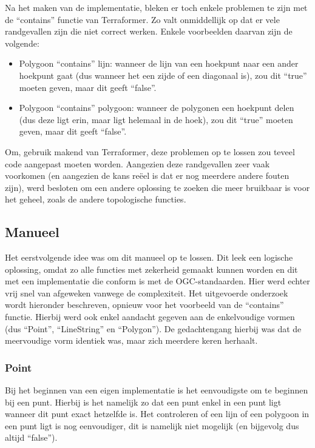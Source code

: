 Na het maken van de implementatie, bleken er toch enkele problemen te zijn met de ``contains'' functie van Terraformer. Zo valt onmiddellijk op dat er vele randgevallen zijn die niet correct werken. Enkele voorbeelden daarvan zijn de volgende:
\begin{itemize}
    \item Polygoon ``contains'' lijn: wanneer de lijn van een hoekpunt naar een ander hoekpunt gaat (dus wanneer het een zijde of een diagonaal is), zou dit ``true'' moeten geven, maar dit geeft ``false''.
    \item Polygoon ``contains'' polygoon: wanneer de polygonen een hoekpunt delen (dus deze ligt erin, maar ligt helemaal in de hoek), zou dit ``true'' moeten geven, maar dit geeft ``false''.
\end{itemize}

Om, gebruik makend van Terraformer, deze problemen op te lossen zou teveel code aangepast moeten worden. Aangezien deze randgevallen zeer vaak voorkomen (en aangezien de kans reëel is dat er nog meerdere andere fouten zijn), werd besloten om een andere oplossing te zoeken die meer bruikbaar is voor het geheel, zoals de andere topologische functies.

\subsection{Manueel}
Het eerstvolgende idee was om dit manueel op te lossen. Dit leek een logische oplossing, omdat zo alle functies met zekerheid gemaakt kunnen worden en dit met een implementatie die conform is met de OGC-standaarden. Hier werd echter vrij snel van afgeweken vanwege de complexiteit. Het uitgevoerde onderzoek wordt hieronder beschreven, opnieuw voor het voorbeeld van de ``contains'' functie. Hierbij werd ook enkel aandacht gegeven aan de enkelvoudige vormen (dus ``Point'', ``LineString'' en ``Polygon''). De gedachtengang hierbij was dat de meervoudige vorm identiek was, maar zich meerdere keren herhaalt.

\subsubsection{Point}
Bij het beginnen van een eigen implementatie is het eenvoudigste om te beginnen bij een punt. Hierbij is het namelijk zo dat een punt enkel in een punt ligt wanneer dit punt exact hetzelfde is. Het controleren of een lijn of een polygoon in een punt ligt is nog eenvoudiger, dit is namelijk niet mogelijk (en bijgevolg dus altijd ``false'').  

